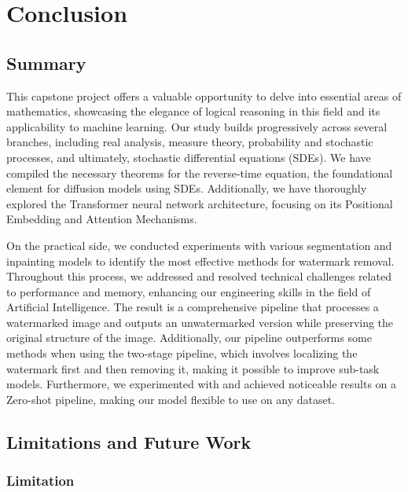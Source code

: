 \chapter{Conclusion}
\thispagestyle{empty}
\section{Summary}

This capstone project offers a valuable opportunity to delve into essential areas of mathematics, showcasing the elegance of logical reasoning in this field and its applicability to machine learning. Our study builds progressively across several branches, including real analysis, measure theory, probability and stochastic processes, and ultimately, stochastic differential equations (SDEs). We have compiled the necessary theorems for the reverse-time equation, the foundational element for diffusion models using SDEs. Additionally, we have thoroughly explored the Transformer neural network architecture, focusing on its Positional Embedding and Attention Mechanisms.

On the practical side, we conducted experiments with various segmentation and inpainting models to identify the most effective methods for watermark removal. Throughout this process, we addressed and resolved technical challenges related to performance and memory, enhancing our engineering skills in the field of Artificial Intelligence. The result is a comprehensive pipeline that processes a watermarked image and outputs an unwatermarked version while preserving the original structure of the image. Additionally, our pipeline outperforms some methods when using the two-stage pipeline, which involves localizing the watermark first and then removing it, making it possible to improve sub-task models. Furthermore, we experimented with and achieved noticeable results on a Zero-shot pipeline, making our model flexible to use on any dataset.



\section{Limitations and Future Work}
\subsection{Limitation}

